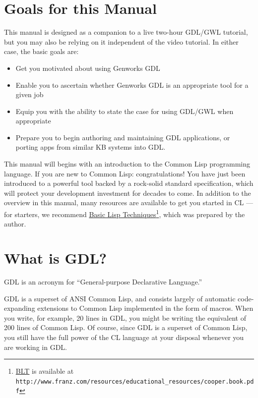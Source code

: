 \documentclass [11pt]{book}
\begin{document}
\section{Goals for this Manual}

\label{sec:goalsforthismanual}

This manual is designed as a companion to a live two-hour
GDL/GWL tutorial, but you may also be relying on it independent of the
video tutorial. In either case, the basic goals are:

\begin{itemize}

\item Get you motivated about using Genworks GDL

\item Enable you to ascertain whether Genworks GDL is an appropriate tool for a given job

\item Equip you with the ability to state the case for using GDL/GWL when appropriate

\item Prepare you to begin authoring and maintaining GDL
applications, or porting apps from similar KB systems into GDL.

\end{itemize}

This manual will begins with an introduction to the Common Lisp programming language. If you are new to Common Lisp:
congratulations! You have just been introduced to a powerful tool
backed by a rock-solid standard specification, which will protect your
development investment for decades to come. In addition to the
overview in this manual, many resources are available to get you
started in CL --- for starters, we recommend 
\underline{Basic Lisp Techniques}\footnote{
\underline{BLT} is available at \texttt{http://www.franz.com/resources/educational\_resources/cooper.book.pdf}}, which was prepared by the author. 

\section{What is GDL?}

\label{sec:whatisgdl?}

GDL is an acronym for
``General-purpose Declarative Language.'' 

GDL is a superset of ANSI Common Lisp, and consists largely of
automatic code-expanding extensions to Common Lisp implemented in the
form of macros. When you write, for example, 20 lines in GDL, you
might be writing the equivalent of 200 lines of Common Lisp. Of
course, since GDL is a superset of Common Lisp, you still have the
full power of the CL language at your disposal whenever you are
working in GDL.
\end{document}
